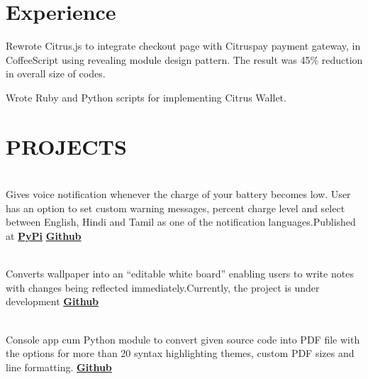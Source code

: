 \documentclass[]{deedy-resume-openfont}
\begin{document}
\begin{minipage}[t]{0.66\textwidth} 


\section{Experience}

\vspace{\topsep} 
\begin{tightemize}
\item Rewrote Citrus.js to integrate checkout page with Citruspay payment gateway, in CoffeeScript using revealing module design pattern. The result was 45\% reduction in overall size of codes. \item Wrote Ruby and Python scripts for implementing Citrus Wallet. \end{tightemize}
\sectionsep


\section{PROJECTS}
\\
Gives voice notification whenever the charge of your battery becomes low. User has an option to set custom warning messages, percent charge level and select between English, Hindi and Tamil as one of the notification languages.Published at \textbf{\href{https://pypi.python.org/pypi/Balert}{PyPi}} \textbf{\href{https://github.com/tushar-rishav/balert}{Github}}
\sectionsep

\\
Converts wallpaper into an “editable white board” enabling users to write notes with changes being reflected immediately.Currently, the project is
under development \textbf{\href{https://github.com/tushar-rishav/wallnote}{Github}}
\sectionsep

\\
Console app cum Python module to convert given source code into PDF file with the options for more than 20 syntax highlighting themes, custom PDF sizes and line formatting. \textbf{\href{https://github.com/tushar-rishav/code2pdf}{Github}}
\sectionsep


\end{minipage}
\end{document}
